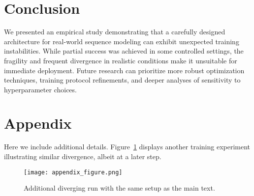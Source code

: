 \documentclass{article}
\begin{document}
\newpage
\section{Conclusion}
We presented an empirical study demonstrating that a carefully designed architecture for real-world sequence modeling can exhibit unexpected training instabilities. While partial success was achieved in some controlled settings, the fragility and frequent divergence in realistic conditions make it unsuitable for immediate deployment. Future research can prioritize more robust optimization techniques, training protocol refinements, and deeper analyses of sensitivity to hyperparameter choices.




\appendix
\section{Appendix}
Here we include additional details. Figure~\ref{fig:extra_run} displays another training experiment illustrating similar divergence, albeit at a later step.

\begin{figure}[h]
\centering
\texttt{[image: appendix\_figure.png]}
\caption{Additional diverging run with the same setup as the main text.}
\label{fig:extra_run}
\end{figure}
\end{document}
